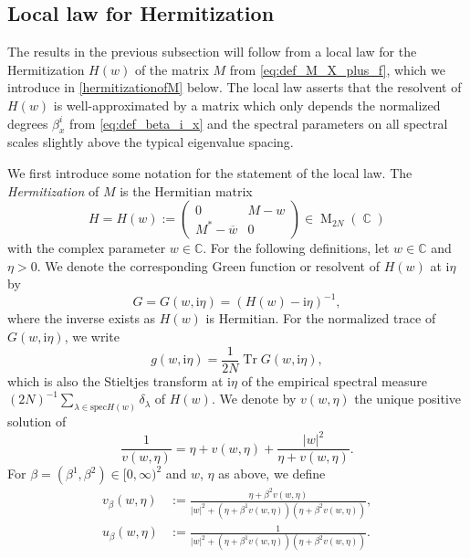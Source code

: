 \documentclass[11pt]{article}
\DeclareMathOperator{\Tr}{Tr}
\DeclareMathOperator{\CC}{\mathbb{C}}
\DeclareMathOperator{\Mat}{\mathrm{M}}
\newcommand{\ii}{\mathrm{i}}
\newcommand{\abs}[1]{\left| #1 \right|}
\newcommand{\C}{\mathbb{C}}
\theoremstyle{plain}
\theoremstyle{remark}
\numberwithin{equation}{section}
\begin{document}
	\subsection{Local law for Hermitization} 
	
	
	
	
	The results in the previous subsection will follow from a local law for the Hermitization $H(w)$ of the matrix 
	$M$ from \cref{eq:def_M_X_plus_f}, which we introduce in \cref{hermitizationofM} below.
	The local law asserts that the resolvent of $H(w)$ is well-approximated by a matrix 
	which only depends the normalized degrees $\beta_x^i$ from \cref{eq:def_beta_i_x} and the spectral parameters on all spectral scales slightly above the typical eigenvalue spacing. 
	
	We first introduce some notation for the statement of the local law.  
	The \emph{Hermitization} of $M$ is the Hermitian matrix 
	\begin{equation}\label{hermitizationofM}
		H=H(w) :=\begin{pmatrix} 
			0                       &       M-w \\
			
			M^{\ast}- \overline{w} & 0
		\end{pmatrix}  \in \Mat_{2N}(\CC) 
	\end{equation}
	with the complex parameter $w \in\C$. 
	For the following definitions, let $w \in \C$ and $\eta >0$.
	We denote the corresponding Green function or resolvent of $H(w)$ at $\ii \eta$ by 
	\begin{equation}\label{Greenfunction}
		G=G(w,\ii\eta) = (H(w)- \ii \eta)^{-1}, 
	\end{equation}
	where the inverse exists as $H(w)$ is Hermitian. 
	For the normalized trace of $G(w,\ii \eta)$, we write 
	\begin{equation} \label{eq:def_g} 
		g(w,\ii \eta) = \frac{1}{2N} \Tr G(w,\ii \eta),  
	\end{equation} 
	which is also the Stieltjes transform at $\ii \eta$ of the empirical spectral measure $(2N)^{-1} \sum_{\lambda \in \mathrm{spec}H(w)}\delta_\lambda$ of $H(w)$.  
	We denote by $v(w,\eta)$ the unique positive solution of 
	\begin{equation} \label{eq:v} 
		\frac{1}{v(w,\eta)}= \eta + v(w,\eta) + \frac{\abs{w}^2}{\eta + v(w,\eta)}. 
	\end{equation} 
	For $\beta= (\beta^1,\beta^2) \in[0,\infty)^2$ and $w$, $\eta$ as above, we define  
	\begin{align}  
		v_\beta(w,\eta) & := \frac{\eta + \beta^2 v(w,\eta)}{\abs{w}^2 + (\eta + \beta^1 v(w,\eta))(\eta + \beta^2 v(w,\eta))},  
		\label{eq:def_v_beta}\\ 
		u_\beta(w,\eta) & := \frac{1}{\abs{w}^2 + (\eta + \beta^1 v(w,\eta))(\eta + \beta^2 v(w,\eta))}. 
		\label{eq:def_u_beta} 
	\end{align} 
\end{document}
